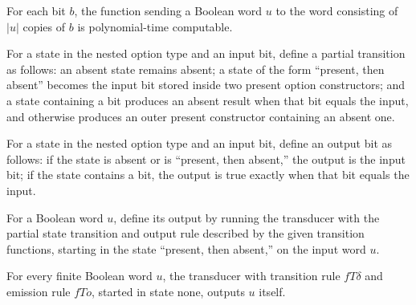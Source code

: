 \begin{theorem}
\label{Complexity.Meyer.pt_constMap}
\leanok
{}
For each bit $b$, the function sending a Boolean word $u$ to the word consisting of
$|u|$ copies of $b$ is polynomial-time computable.
\end{theorem}

\begin{definition}
\leanok
For a state in the nested option type and an input bit, define a partial transition as
follows: an absent state remains absent; a state of the form “present, then absent”
becomes the input bit stored inside two present option constructors; and a state
containing a bit produces an absent result when that bit equals the input, and otherwise
produces an outer present constructor containing an absent one.
\end{definition}

\begin{definition}
\label{Complexity.Meyer.fTo}
\leanok
For a state in the nested option type and an input bit, define an output bit as follows:
if the state is absent or is “present, then absent,” the output is the input bit; if the
state contains a bit, the output is true exactly when that bit equals the input.
\end{definition}

\begin{definition}
\label{Complexity.Meyer.fT}
\leanok
{}
For a Boolean word $u$, define its output by running the transducer with the partial
state transition and output rule described by the given transition functions, starting
in the state “present, then absent,” on the input word $u$.
\end{definition}

\begin{theorem}
\label{Complexity.Meyer.transduce_fT_copy}
\leanok
{}
For every finite Boolean word $u$, the transducer with transition rule $fTδ$ and
emission rule $fTo$, started in state $\mathrm{none}$, outputs $u$ itself.
\end{theorem}

